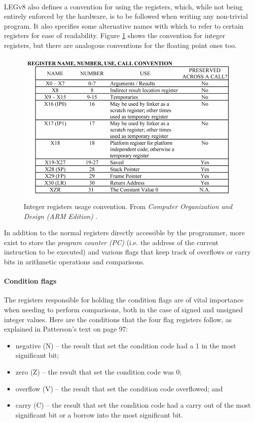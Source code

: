 \paragraph{}
LEGv8 also defines a convention for using the registers, which, while not being entirely enforced by the hardware, is to be followed when writing any non-trivial program. It also specifies some alternative names with which to refer to certain registers for ease of readability. Figure \ref{fig:legv8intregconv} shows the convention for integer registers, but there are analogous conventions for the floating point ones too.
\begin{figure}[H]
	\centering
	\includegraphics[width=1\textwidth]{img/registers_conventions.png}
	\caption{Integer registers usage convention. From \emph{Computer Organization and Design (ARM Edition)} \cite{patterson2016computer}.}
 \label{fig:legv8intregconv}
\end{figure}

In addition to the normal registers directly accessible by the programmer, more exist to store the \emph{program counter (PC)} (i.e. the address of the current instruction to be executed) and various flags that keep track of overflows or carry bits in arithmetic operations and comparisons.
\paragraph{Condition flags}
The registers responsible for holding the condition flags are of vital importance when needing to perform comparisons, both in the case of signed and unsigned integer values. Here are the conditions that the four flag registers follow, as explained in Patterson's text \cite{patterson2016computer} on page 97:
\begin{itemize}
    \item negative (N) – the result that set the condition code had a 1 in the most
significant bit;
\item zero (Z) – the result that set the condition code was 0;
\item overflow (V) – the result that set the condition code overflowed; and
\item carry (C) – the result that set the condition code had a carry out of the most
significant bit or a borrow into the most significant bit.
\end{itemize}


